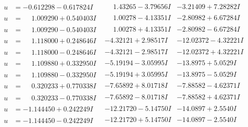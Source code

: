 \documentclass[1p]{elsarticle_modified}
\theoremstyle{definition}
\begin{document}
$$\begin{array}{c|c|c}
\begin{aligned}
u &= -0.612298 - 0.617824 I\end{aligned}
 & \phantom{-}1.43265 - 3.79656 I & -3.21409 + 7.28282 I \\ \hline\begin{aligned}
u &= \phantom{-}1.009290 + 0.540403 I\end{aligned}
 & \phantom{-}1.00278 - 4.13351 I & -2.80982 + 6.67284 I \\ \hline\begin{aligned}
u &= \phantom{-}1.009290 - 0.540403 I\end{aligned}
 & \phantom{-}1.00278 + 4.13351 I & -2.80982 - 6.67284 I \\ \hline\begin{aligned}
u &= \phantom{-}1.118000 + 0.248646 I\end{aligned}
 & -4.32121 + 2.98517 I & -12.02372 - 4.32221 I \\ \hline\begin{aligned}
u &= \phantom{-}1.118000 - 0.248646 I\end{aligned}
 & -4.32121 - 2.98517 I & -12.02372 + 4.32221 I \\ \hline\begin{aligned}
u &= \phantom{-}1.109880 + 0.332950 I\end{aligned}
 & -5.19194 - 3.05995 I & -13.8975 + 5.0529 I \\ \hline\begin{aligned}
u &= \phantom{-}1.109880 - 0.332950 I\end{aligned}
 & -5.19194 + 3.05995 I & -13.8975 - 5.0529 I \\ \hline\begin{aligned}
u &= \phantom{-}0.320233 + 0.770338 I\end{aligned}
 & -7.65892 + 8.01718 I & -7.88582 - 4.62371 I \\ \hline\begin{aligned}
u &= \phantom{-}0.320233 - 0.770338 I\end{aligned}
 & -7.65892 - 8.01718 I & -7.88582 + 4.62371 I \\ \hline\begin{aligned}
u &= -1.144450 + 0.242249 I\end{aligned}
 & -12.21720 - 5.14750 I & -14.0897 + 2.5540 I \\ \hline\begin{aligned}
u &= -1.144450 - 0.242249 I\end{aligned}
 & -12.21720 + 5.14750 I & -14.0897 - 2.5540 I \\ \hline\begin{aligned}

\end{aligned}
\end{array}$$
\end{document}
